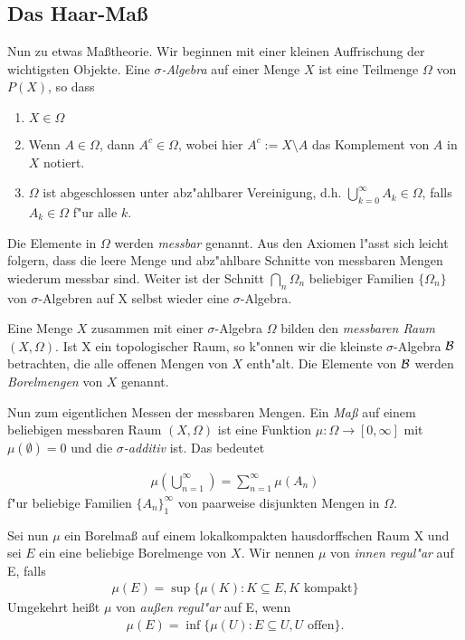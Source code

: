 \subsection{Das Haar-Maß}
	Nun zu etwas Maßtheorie. Wir beginnen mit einer kleinen Auffrischung der wichtigsten Objekte. 
	Eine \emph{$\sigma$-Algebra} auf einer Menge $X$ ist eine Teilmenge $\Omega$ von $P(X)$, so dass
	\begin{enumerate}[label=(\roman*)]
		\item $X \in \Omega$
		\item Wenn $A \in \Omega$, dann $A^c \in \Omega$, wobei hier $A^c := X\setminus A$ das Komplement von $A$ in $X$ notiert.
		\item $\Omega$ ist abgeschlossen unter abz"ahlbarer Vereinigung, d.h. $\bigcup_{k=0}^{\infty} A_k \in \Omega$, falls $A_k \in \Omega$ f"ur alle $k$.
	\end{enumerate}
	Die Elemente in $\Omega$ werden \emph{messbar} genannt. 
	Aus den Axiomen l"asst sich leicht folgern, dass die leere Menge und abz"ahlbare Schnitte von messbaren Mengen wiederum messbar sind. 
	Weiter ist der Schnitt $\bigcap_n \Omega_n$ beliebiger Familien $\{\Omega_n\}$ von $\sigma$-Algebren auf X selbst wieder eine $\sigma$-Algebra.
	
	
	Eine Menge $X$ zusammen mit einer $\sigma$-Algebra $\Omega$ bilden den \emph{messbaren Raum} $(X, \Omega)$. 
	Ist X ein topologischer Raum, so k"onnen wir die kleinste $\sigma$-Algebra $\mathcal{B}$ betrachten, die alle offenen Mengen von $X$ enth"alt. 
	Die Elemente von $\mathcal{B}$ werden \emph{Borelmengen} von $X$ genannt.
	
	
	Nun zum eigentlichen Messen der messbaren Mengen. 
	Ein \emph{Maß} auf einem beliebigen messbaren Raum $(X, \Omega)$ ist eine Funktion $\mu: \Omega \to [0, \infty]$ mit $\mu(\emptyset) = 0$ und die \emph{$\sigma$-additiv} ist. 
	Das bedeutet
	
	\begin{align*}
		\mu( \bigcup_{n=1}^{\infty}) = \sum_{n=1}^{\infty} \mu (A_n)
	\end{align*}
	f"ur beliebige Familien $\{A_n\}_1^\infty$ von paarweise disjunkten Mengen in $\Omega$.
	
	
	Sei nun $\mu$ ein Borelmaß auf einem lokalkompakten hausdorffschen Raum X und sei $E$ ein eine beliebige Borelmenge von $X$.
	Wir nennen $\mu$ von \emph{innen regul"ar} auf E, falls
	\begin{align*}
		\mu(E) = \sup\{\mu(K): K \subseteq E, K \text{ kompakt}\}
	\end{align*}
	Umgekehrt heißt $\mu$ von \emph{außen regul"ar} auf E, wenn
	\begin{align*}
		\mu(E) = \inf\{\mu(U): E \subseteq U, U \text{ offen}\}.
	\end{align*}
	
